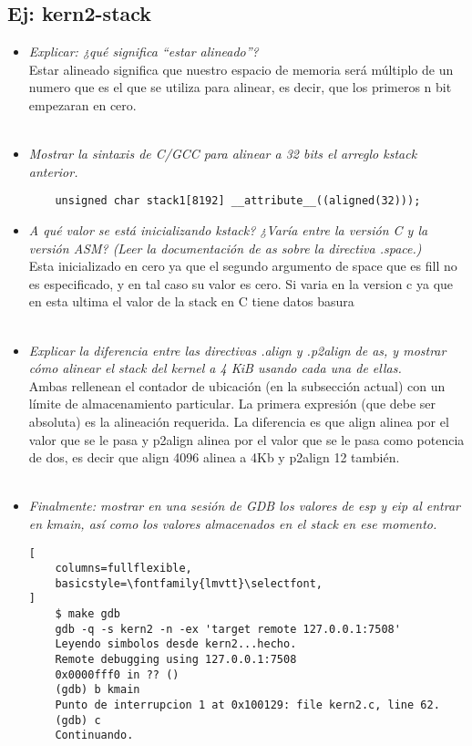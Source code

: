 \documentclass[a4paper, 12pt]{article}
\begin{document}
		\subsection{Ej: kern2-stack}
		\begin{itemize}
			\item \textit{Explicar: ¿qué significa “estar alineado”?\\}
		Estar alineado significa que nuestro espacio de memoria será
		múltiplo de un numero que es el que se utiliza para alinear, es decir,
		que los primeros n bit empezaran en cero.\\\\
			\item \textit{Mostrar la sintaxis de C/GCC para alinear a 32 bits
			el arreglo kstack anterior.\\}
\begin{lstlisting}
	unsigned char stack1[8192] __attribute__((aligned(32)));
\end{lstlisting}
			\item \textit{A qué valor se está inicializando kstack?
			¿Varía entre la versión C y la versión ASM? (Leer la documentación
			de as sobre la directiva .space.)\\}
		Esta inicializado en cero ya que el segundo argumento de space que es
		fill no es especificado, y en tal caso su valor es cero. Si varia en la
		version c ya que en esta ultima el valor de la stack en C tiene datos
		basura\\\\
			\item \textit{Explicar la diferencia entre las directivas .align y
			.p2align de as, y mostrar cómo alinear el stack del kernel a 4 KiB
			usando cada una de ellas.\\}
		Ambas rellenean el contador de ubicación (en la subsección actual) con
		un límite de almacenamiento particular. La primera expresión
		(que debe ser absoluta) es la alineación requerida. La diferencia es que
		align alinea por el valor que se le pasa y p2align alinea por el valor
		que se le pasa como potencia de dos, es decir que align 4096 alinea a
		4Kb y p2align 12 también.\\\\
			\item \textit{Finalmente: mostrar en una sesión de GDB los valores
			de esp y eip al entrar en kmain, así como los valores almacenados
			en el stack en ese momento.\\}
\begin{lstlisting}[
	columns=fullflexible,
	basicstyle=\fontfamily{lmvtt}\selectfont,
]
	$ make gdb
	gdb -q -s kern2 -n -ex 'target remote 127.0.0.1:7508'
	Leyendo simbolos desde kern2...hecho.
	Remote debugging using 127.0.0.1:7508
	0x0000fff0 in ?? ()
	(gdb) b kmain
	Punto de interrupcion 1 at 0x100129: file kern2.c, line 62.
	(gdb) c
	Continuando.


\end{lstlisting}
\end{itemize}
\end{document}
